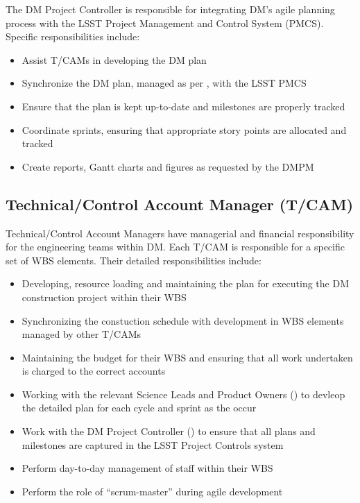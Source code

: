 The DM Project Controller is responsible for integrating DM's agile planning process with the LSST Project Management and Control System (PMCS). Specific responsibilities include:

\begin{itemize}

  \item{Assist T/CAMs in developing the DM plan}
  \item{Synchronize the DM plan, managed as per , with the LSST PMCS}
  \item{Ensure that the plan is kept up-to-date and milestones are properly tracked}
  \item{Coordinate sprints, ensuring that appropriate story points are allocated and tracked}
  \item{Create reports, Gantt charts and figures as requested by the DMPM}

\end{itemize}

\subsection{Technical/Control Account Manager (T/CAM) \label{role:tcam}}

Technical/Control Account Managers have managerial and financial responsibility
for the engineering teams within DM. Each T/CAM is responsible for a specific set of WBS elements. Their detailed responsibilities include:

\begin{itemize}

  \item{Developing, resource loading and maintaining the plan for executing the DM construction project within their WBS}
  \item{Synchronizing the constuction schedule with development in WBS elements managed by other T/CAMs}
  \item{Maintaining the budget for their WBS and ensuring that all work undertaken is charged to the correct accounts}
  \item{Working with the relevant Science Leads and Product Owners () to devleop the detailed plan for each cycle and sprint as the occur}
  \item{Work with the DM Project Controller () to ensure that all plans and milestones are captured in the LSST Project Controls system}
  \item{Perform day-to-day management of staff within their WBS}
  \item{Perform the role of ``scrum-master'' during agile development}

\end{itemize}

